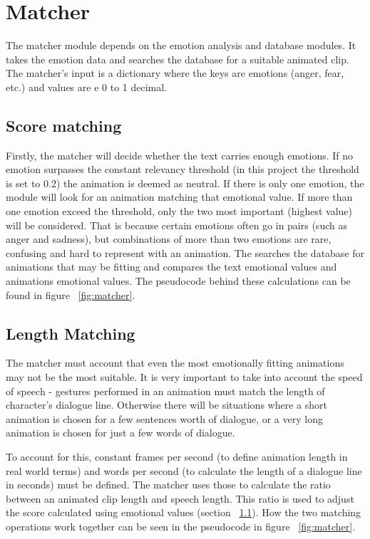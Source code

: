 \section{Matcher}

The matcher module depends on the emotion analysis and database modules. It takes the emotion data and searches the database for a suitable animated clip. The matcher's input is a dictionary where the keys are emotions (anger, fear, etc.) and values are e 0 to 1 decimal.

\subsection{Score matching}
\label{sec:scorematching}
Firstly, the matcher will decide whether the text carries enough emotions. If no emotion surpasses the constant relevancy threshold (in this project the threshold is set to 0.2) the animation is deemed as neutral. If there is only one emotion, the module will look for an animation matching that emotional value. If more than one emotion exceed the threshold, only the two most important (highest value) will be considered. That is because certain emotions often go in pairs (such as anger and sadness), but combinations of more than two emotions are rare, confusing and hard to represent with an animation. The searches the database for animations that may be fitting and compares the text emotional values and animations emotional values. The pseudocode behind these calculations can be found in figure ~\ref{fig:matcher}.

\subsection{Length Matching}
The matcher must account that even the most emotionally fitting animations may not be the most suitable. It is very important to take into account the speed of speech - gestures performed in an animation must match the length of character's dialogue line. Otherwise there will be situations where a short animation is chosen for a few sentences worth of dialogue, or a very long animation is chosen for just a few words of dialogue.

To account for this, constant frames per second (to define animation length in real world terms) and words per second (to calculate the length of a dialogue line in seconds) must be defined. The matcher uses those to calculate the ratio between an animated clip length and speech length. This ratio is used to adjust the score calculated using emotional values (section ~\ref{sec:scorematching}). How the two matching operations work together can be seen in the pseudocode in figure ~\ref{fig:matcher}.

